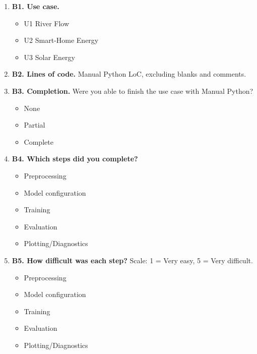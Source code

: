 \begin{enumerate}[leftmargin=*]
    \item \textbf{B1. Use case.}
    \begin{itemize}
        \item U1 River Flow
        \item U2 Smart-Home Energy
        \item U3 Solar Energy
    \end{itemize}

    \item \textbf{B2. Lines of code.}
    Manual Python LoC, excluding blanks and comments.

    \item \textbf{B3. Completion.}
    Were you able to finish the use case with Manual Python?
    \begin{itemize}
        \item None
        \item Partial
        \item Complete
    \end{itemize}

    \item \textbf{B4. Which steps did you complete?}
    \begin{itemize}
        \item Preprocessing
        \item Model configuration
        \item Training
        \item Evaluation
        \item Plotting/Diagnostics
    \end{itemize}

    \item \textbf{B5. How difficult was each step?}
    Scale: 1 = Very easy, 5 = Very difficult.
    \begin{itemize}
        \item Preprocessing
        \item Model configuration
        \item Training
        \item Evaluation
        \item Plotting/Diagnostics
    \end{itemize}


\end{enumerate}

